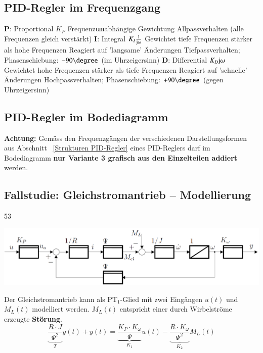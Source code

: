\subsection{PID-Regler im Frequenzgang}

\begin{outline}
    \1 \textbf{P}: Proportional $K_P$
        \2 Frequenz\textbf{un}abhängige Gewichtung
        \2 Allpassverhalten (alle Frequenzen gleich verstärkt)
    \1 \textbf{I}: Integral $K_I \frac{1}{\mathrm{j} \omega}$
        \2 Gewichtet tiefe Frequenzen stärker als hohe Frequenzen
        \2 Reagiert auf 'langsame' Änderungen 
        \2 Tiefpassverhalten; Phasenschiebung: $-90 \degree$ (im Uhrzeigersinn)
    \1 \textbf{D}: Differential $K_D \mathrm{j} \omega$
        \2 Gewichtet hohe Frequenzen stärker als tiefe Frequenzen
        \2 Reagiert auf 'schnelle' Änderungen 
        \2 Hochpassverhalten; Phasenschiebung: $+90 \degree$ (gegen Uhrzeigersinn)
\end{outline}


\subsection{PID-Regler im Bodediagramm}

\textbf{Achtung:} Gemäss den Frequenzgängen der verschiedenen Darstellungsformen aus Abschnitt ~\ref{Strukturen PID-Regler} 
eines PID-Reglers darf im Bodediagramm \textbf{nur Variante 3 grafisch aus den Einzelteilen addiert} werden. 


\subsection{Fallstudie: Gleichstromantrieb -- Modellierung}{53}
\begin{center}
    \includegraphics[width=0.75\columnwidth]{images/vereinfachtes_modell_gleichstromantrieb.png} 
\end{center}
Der Gleichstromantrieb kann als $\text{PT}_1$-Glied mit zwei Eingängen $u(t)$ und $M_L(t)$ modelliert werden. $M_L(t)$ entspricht
einer durch Wirbelströme erzeugte \textbf{Störung}.
$$ \boxed{ \underbrace{\frac{R \cdot J}{\Psi^2}}_{T} \dot{y}(t) + y(t) = \underbrace{\frac{K_P \cdot K_{\omega}}{\Psi}}_{K_1} u(t)
    - \underbrace{\frac{R \cdot K_{\omega}}{\Psi^2}}_{K_2} M_L(t) } $$


